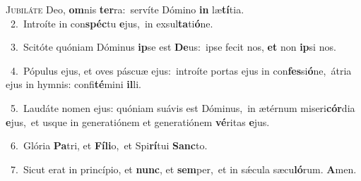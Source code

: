 \lettrine{\initial\textcolor{\initialcolor}{J}}{ubiláte} Deo, \textbf{om}\-nis \textbf{ter}\-ra:~\star servíte Dómino \textbf{in} læ\-\textbf{tí}\-tia.\\
{\numbfont\textcolor{\numbcolor}{~2.}}~Introíte in con\-\textbf{spéc}\-tu \textbf{e}\-jus,~\star in exsul\-\textbf{ta}\-ti\-\textbf{ó}\-ne.\par
{\numbfont\textcolor{\numbcolor}{~3.}}~Scitóte quóniam Dóminus \textbf{ip}\-se est \textbf{De}\-us:~\star ipse fecit nos, \textbf{et} non \textbf{ip}\-si nos.\par
{\numbfont\textcolor{\numbcolor}{~4.}}~Pópulus ejus, et oves páscuæ ejus:~\dagger introíte portas ejus in con\-\textbf{fes}\-si\-\textbf{ó}\-ne,~\star átria ejus in hymnis: confi\-\textbf{té}\-mini \textbf{il}\-li.\par
{\numbfont\textcolor{\numbcolor}{~5.}}~Laudáte nomen ejus: quóniam suávis est Dóminus,~\dagger in ætérnum miseri\-\textbf{cór}\-dia \textbf{e}\-jus,~\star et usque in generatiónem et generatiónem \textbf{vé}\-ritas \textbf{e}\-jus.\par
{\numbfont\textcolor{\numbcolor}{~6.}}~Glória \textbf{Pa}\-tri, et \textbf{Fí}\-\textbf{li}o,~\star et Spi\-\textbf{rí}\-tui \textbf{Sanc}\-to.\par
{\numbfont\textcolor{\numbcolor}{~7.}}~Sicut erat in princípio, et \textbf{nunc}\-, et \textbf{sem}\-per,~\star et in sǽcula sæcu\-\textbf{ló}\-rum. \textbf{A}\-men.\par
